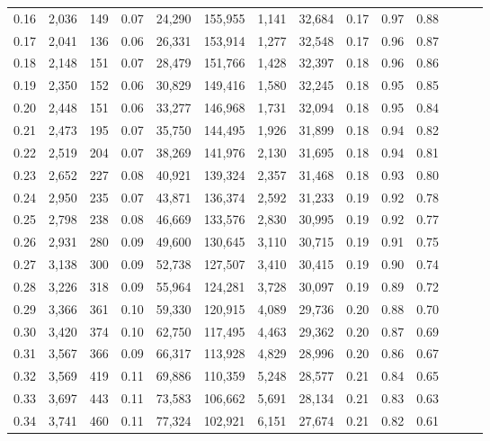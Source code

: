 \begin{tabular}{rrrrrrrrrrrrrr}
0.16 &  2,036 &  149 &  0.07 &   24,290 &  155,955 &   1,141 &  32,684 &  0.17 &  0.97 &      0.88 \\
0.17 &  2,041 &  136 &  0.06 &   26,331 &  153,914 &   1,277 &  32,548 &  0.17 &  0.96 &      0.87 \\
0.18 &  2,148 &  151 &  0.07 &   28,479 &  151,766 &   1,428 &  32,397 &  0.18 &  0.96 &      0.86 \\
0.19 &  2,350 &  152 &  0.06 &   30,829 &  149,416 &   1,580 &  32,245 &  0.18 &  0.95 &      0.85 \\
0.20 &  2,448 &  151 &  0.06 &   33,277 &  146,968 &   1,731 &  32,094 &  0.18 &  0.95 &      0.84 \\
0.21 &  2,473 &  195 &  0.07 &   35,750 &  144,495 &   1,926 &  31,899 &  0.18 &  0.94 &      0.82 \\
0.22 &  2,519 &  204 &  0.07 &   38,269 &  141,976 &   2,130 &  31,695 &  0.18 &  0.94 &      0.81 \\
0.23 &  2,652 &  227 &  0.08 &   40,921 &  139,324 &   2,357 &  31,468 &  0.18 &  0.93 &      0.80 \\
0.24 &  2,950 &  235 &  0.07 &   43,871 &  136,374 &   2,592 &  31,233 &  0.19 &  0.92 &      0.78 \\
0.25 &  2,798 &  238 &  0.08 &   46,669 &  133,576 &   2,830 &  30,995 &  0.19 &  0.92 &      0.77 \\
0.26 &  2,931 &  280 &  0.09 &   49,600 &  130,645 &   3,110 &  30,715 &  0.19 &  0.91 &      0.75 \\
0.27 &  3,138 &  300 &  0.09 &   52,738 &  127,507 &   3,410 &  30,415 &  0.19 &  0.90 &      0.74 \\
0.28 &  3,226 &  318 &  0.09 &   55,964 &  124,281 &   3,728 &  30,097 &  0.19 &  0.89 &      0.72 \\
0.29 &  3,366 &  361 &  0.10 &   59,330 &  120,915 &   4,089 &  29,736 &  0.20 &  0.88 &      0.70 \\
0.30 &  3,420 &  374 &  0.10 &   62,750 &  117,495 &   4,463 &  29,362 &  0.20 &  0.87 &      0.69 \\
0.31 &  3,567 &  366 &  0.09 &   66,317 &  113,928 &   4,829 &  28,996 &  0.20 &  0.86 &      0.67 \\
0.32 &  3,569 &  419 &  0.11 &   69,886 &  110,359 &   5,248 &  28,577 &  0.21 &  0.84 &      0.65 \\
0.33 &  3,697 &  443 &  0.11 &   73,583 &  106,662 &   5,691 &  28,134 &  0.21 &  0.83 &      0.63 \\
0.34 &  3,741 &  460 &  0.11 &   77,324 &  102,921 &   6,151 &  27,674 &  0.21 &  0.82 &      0.61 \\

\end{tabular}
